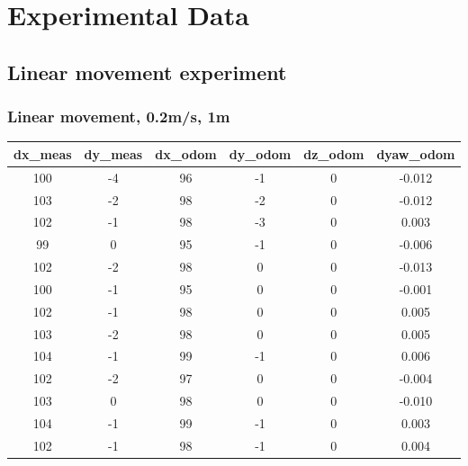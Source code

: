 \documentclass[a4paper, 12pt]{article}
\begin{document}
    \pagebreak


    \section{Experimental Data}

    \subsection{Linear movement experiment}
    \subsubsection{Linear movement, 0.2m/s, 1m}
    \begin{table}[H]
    \scriptsize
    \begin{tabular}{@{}cccccc@{}}
    \toprule
    \textbf{dx\_meas} & \textbf{dy\_meas} & \textbf{dx\_odom} & \textbf{dy\_odom} & \textbf{dz\_odom} & \textbf{dyaw\_odom} \\ \midrule
    100          & -4           & 96       & -1       & 0        & -0.012     \\
    103          & -2           & 98       & -2       & 0        & -0.012     \\
    102          & -1           & 98       & -3       & 0        & 0.003      \\
    99           & 0            & 95       & -1       & 0        & -0.006     \\
    102          & -2           & 98       & 0        & 0        & -0.013     \\
    100          & -1           & 95       & 0        & 0        & -0.001     \\
    102          & -1           & 98       & 0        & 0        & 0.005      \\
    103          & -2           & 98       & 0        & 0        & 0.005      \\
    104          & -1           & 99       & -1       & 0        & 0.006      \\
    102          & -2           & 97       & 0        & 0        & -0.004     \\
    103          & 0            & 98       & 0        & 0        & -0.010     \\
    104          & -1           & 99       & -1       & 0        & 0.003      \\
    102          & -1           & 98       & -1       & 0        & 0.004      \\

\end{tabular}
\end{table}
\end{document}
